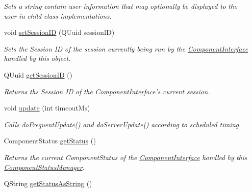 \begin{DoxyCompactItemize}
\begin{DoxyCompactList}\small\item\em Sets a string contain user information that may optionally be displayed to the user in child class implementations. \end{DoxyCompactList}\item 
void \hyperlink{class_component_status_manager_aa89d24ea10eef26877ff5e4e7a18c211}{set\-Session\-I\-D} (Q\-Uuid session\-I\-D)
\begin{DoxyCompactList}\small\item\em Sets the Session I\-D of the session currently being run by the \hyperlink{class_component_interface}{Component\-Interface} handled by this object. \end{DoxyCompactList}\item 
\hypertarget{class_component_status_manager_aa9ef67463e97c86b2d3cb6f58a75e9ec}{Q\-Uuid \hyperlink{class_component_status_manager_aa9ef67463e97c86b2d3cb6f58a75e9ec}{get\-Session\-I\-D} ()}\label{class_component_status_manager_aa9ef67463e97c86b2d3cb6f58a75e9ec}

\begin{DoxyCompactList}\small\item\em Returns ths Session I\-D of the \hyperlink{class_component_interface}{Component\-Interface}'s current session. \end{DoxyCompactList}\item 
void \hyperlink{class_component_status_manager_a93b324f1e8ecbe6870958f3c4c3a8ca0}{update} (int timeout\-Ms)
\begin{DoxyCompactList}\small\item\em Calls do\-Frequent\-Update() and do\-Server\-Update() according to scheduled timing. \end{DoxyCompactList}\item 
\hypertarget{class_component_status_manager_a2bb141c50399cc6108f0990c087c5bd5}{Component\-Status \hyperlink{class_component_status_manager_a2bb141c50399cc6108f0990c087c5bd5}{get\-Status} ()}\label{class_component_status_manager_a2bb141c50399cc6108f0990c087c5bd5}

\begin{DoxyCompactList}\small\item\em Returns the current Component\-Status of the \hyperlink{class_component_interface}{Component\-Interface} handled by this \hyperlink{class_component_status_manager}{Component\-Status\-Manager}. \end{DoxyCompactList}\item 
\hypertarget{class_component_status_manager_ac7af74c88de4929291c2146fd7649745}{Q\-String \hyperlink{class_component_status_manager_ac7af74c88de4929291c2146fd7649745}{get\-Status\-As\-String} ()}\label{class_component_status_manager_ac7af74c88de4929291c2146fd7649745}


\end{DoxyCompactItemize}
